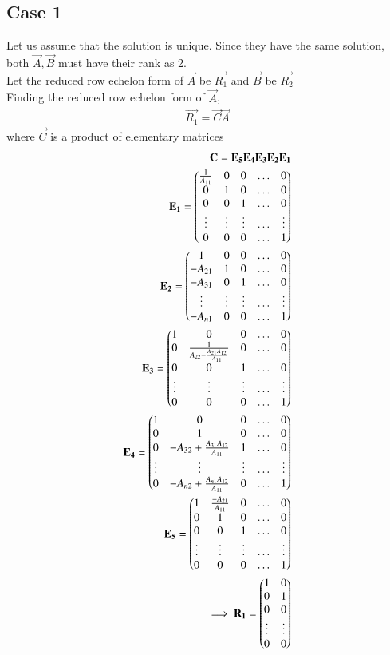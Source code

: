 \documentclass[journal,12pt,twocolumn]{IEEEtran}
\begin{document}
\subsection{Case 1}
Let us assume that the solution is unique.
Since they have the same solution, both $\vec{A},\vec{B}$ must have their rank as 2.\\
Let the reduced row echelon form of $\vec{A}$ be $\vec{R_1}$ and $\vec{B}$ be $\vec{R_2}$\\
Finding the reduced row echelon form of $\vec{A}$,
\begin{align}
    \vec{R_1}=\vec{C}\vec{A}\label{3}
\end{align}
where $\vec{C}$ is a product of elementary matrices
\begin{align}
    \mathbf{C}=\mathbf{E_5}\mathbf{E_4}\mathbf{E_3}\mathbf{E_2}\mathbf{E_1}\\
    \mathbf{E_1}=\begin{pmatrix}\frac{1}{A_{11}}&0&0&\hdots&0\\0&1&0&\hdots&0\\0&0&1&\hdots&0\\\vdots&\vdots&\vdots&\hdots&\vdots\\0&0&0&\hdots&1\end{pmatrix}\\
   \mathbf{E_2}=\begin{pmatrix}1&0&0&\hdots&0\\-A_{21}&1&0&\hdots&0\\-A_{31}&0&1&\hdots&0\\\vdots&\vdots&\vdots&\hdots&\vdots\\-A_{n1}&0&0&\hdots&1\end{pmatrix}\\
   \mathbf{E_3}=\begin{pmatrix}1&0&0&\hdots&0\\0&\frac{1}{A_{22}-\frac{A_{21}A_{12}}{A_{11}}}&0&\hdots&0\\0&0&1&\hdots&0\\\vdots&\vdots&\vdots&\hdots&\vdots\\0&0&0&\hdots&1\end{pmatrix}\\
   \mathbf{E_4}=\begin{pmatrix}1&0&0&\hdots&0\\0&1&0&\hdots&0\\0&-A_{32}+\frac{A_{31}A_{12}}{A_{11}}&1&\hdots&0\\\vdots&\vdots&\vdots&\hdots&\vdots\\0&-A_{n2}+\frac{A_{n1}A_{12}}{A_{11}}&0&\hdots&1\end{pmatrix}\\
   \mathbf{E_5}=\begin{pmatrix}1&\frac{-A_{21}}{A_{11}}&0&\hdots&0\\0&1&0&\hdots&0\\0&0&1&\hdots&0\\\vdots&\vdots&\vdots&\hdots&\vdots\\0&0&0&\hdots&1\end{pmatrix}\\
   \implies \mathbf{R_1}=\begin{pmatrix}1&0\\0&1\\0&0\\\vdots&\vdots\\0&0\end{pmatrix}
\end{align}
\end{document}
